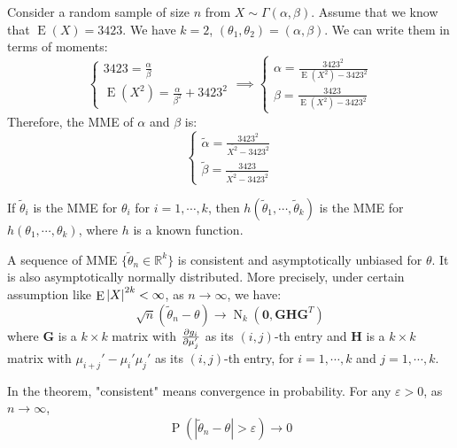 \documentclass{huhtakm-template-book-v2}
\DeclareMathOperator{\prob}{P}
\DeclareMathOperator{\E}{E}
\DeclareMathOperator{\N}{N}
\begin{document}
\begin{eg}
	Consider a random sample of size $n$ from $X\sim\Gamma(\alpha,\beta)$. Assume that we know that $\E(X)=3423$. We have $k=2$, $(\theta_{1},\theta_{2})=(\alpha,\beta)$. We can write them in terms of moments:
	\begin{equation*}
		\begin{cases}
			3423=\frac{\alpha}{\beta}\\
			\E(X^{2})=\frac{\alpha}{\beta^{2}}+3423^{2}
		\end{cases}\implies\begin{cases}
			\alpha=\frac{3423^{2}}{\E(X^{2})-3423^{2}}\\
			\beta=\frac{3423}{\E(X^{2})-3423^{2}}
		\end{cases}
	\end{equation*}
	Therefore, the MME of $\alpha$ and $\beta$ is:
	\begin{equation*}
		\begin{cases}
			\widetilde{\alpha}=\frac{3423^{2}}{\overline{X^{2}}-3423^{2}}\\
			\widetilde{\beta}=\frac{3423}{\overline{X^{2}}-3423^{2}}
		\end{cases}
	\end{equation*}
\end{eg}
\begin{lem}
	If $\widetilde{\theta}_{i}$ is the MME for $\theta_{i}$ for $i=1,\cdots,k$, then $h(\widetilde{\theta}_{1},\cdots,\widetilde{\theta}_{k})$ is the MME for $h(\theta_{1},\cdots,\theta_{k})$, where $h$ is a known function.
\end{lem}
\begin{thm}
	\label{Chapter 2 (Thoerem) Sequence of MME is asympt. normal}
	A sequence of MME $\{\widetilde{\theta}_{n}\in\mathbb{R}^{k}\}$ is consistent and asymptotically unbiased for $\theta$. It is also asymptotically normally distributed. More precisely, under certain assumption like $\E\abs{X}^{2k}<\infty$, as $n\to\infty$, we have:
	\begin{equation*}
		\sqrt{n}(\widetilde{\theta}_{n}-\theta)\to\N_{k}(\mathbf{0},\mathbf{GHG}^{T})
	\end{equation*}
	where $\mathbf{G}$ is a $k\times k$ matrix with $\pdv{g_{i}}{\mu_{j}'}$ as its $(i,j)$-th entry and $\mathbf{H}$ is a $k\times k$ matrix with $\mu_{i+j}'-\mu_{i}'\mu_{j}'$ as its $(i,j)$-th entry, for $i=1,\cdots,k$ and $j=1,\cdots,k$.
\end{thm}
\begin{rem}
	In the theorem, "consistent" means convergence in probability. For any $\varepsilon>0$, as $n\to\infty$,
	\begin{equation*}
		\prob(|\widetilde{\theta}_{n}-\theta|>\varepsilon)\to 0
	\end{equation*}
\end{rem}
\end{document}
